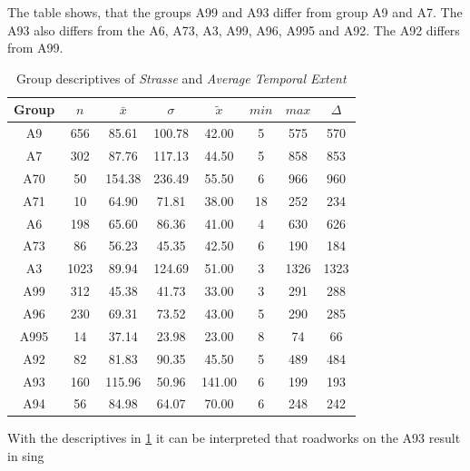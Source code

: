 The table shows, that the groups A99 and A93 differ from group A9 and A7. The A93 also differs from the A6, A73, A3, A99, A96, A995 and A92. The A92 differs from A99.
\begin{table}[ht!]
	\tiny
	\centering
	\begin{tabular}{c|c|c|c|c|c|c|c}
		\toprule
		Group & $n$ & $\bar{x}$ & $\sigma$ & $\tilde{x}$ & $min$ & $max$ & $\Delta$ \\
		\midrule
		A9   & 656  & 85.61  & 100.78 & 42.00  & 5  & 575  & 570 \\ 
		A7   & 302  & 87.76  & 117.13 & 44.50  & 5  & 858  & 853 \\ 
		A70  & 50   & 154.38 & 236.49 & 55.50  & 6  & 966  & 960 \\ 
		A71  & 10   & 64.90  & 71.81  & 38.00  & 18 & 252  & 234 \\ 
		A6   & 198  & 65.60  & 86.36  & 41.00  & 4  & 630  & 626 \\ 
		A73  & 86   & 56.23  & 45.35  & 42.50  & 6  & 190  & 184 \\ 
		A3   & 1023 & 89.94  & 124.69 & 51.00  & 3  & 1326 & 1323 \\ 
		A99  & 312  & 45.38  & 41.73  & 33.00  & 3  & 291  & 288 \\ 
		A96  & 230  & 69.31  & 73.52  & 43.00  & 5  & 290  & 285 \\ 
		A995 & 14   & 37.14  & 23.98  & 23.00  & 8  & 74   & 66 \\ 
		A92  & 82   & 81.83  & 90.35  & 45.50  & 5  & 489  & 484 \\ 
		A93  & 160  & 115.96 & 50.96  & 141.00 & 6  & 199  & 193 \\ 
		A94  & 56   & 84.98  & 64.07  & 70.00  & 6  & 248  & 242 \\ 
		\midrule
	\end{tabular}
	\caption{Group descriptives of \textit{Strasse} and \textit{Average Temporal Extent}}
	\label{tbl:descriptives_arbis_matched_Strasse_TAvg}
\end{table}
With the descriptives in \cref{tbl:descriptives_arbis_matched_Strasse_TAvg} it can be interpreted that roadworks on the A93 result in sing

